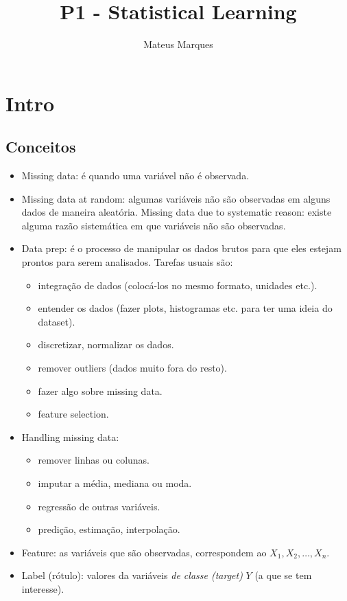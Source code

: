\documentclass[a4paper,fleqn,12pt]{article}
\title{\Huge{\textbf{P1 - Statistical Learning}}}
\author{Mateus Marques}
\begin{document}
\maketitle

\section{Intro}

\subsection{Conceitos}

\begin{itemize}
\item Missing data: é quando uma variável não é observada.
\item Missing data at random: algumas variáveis não são observadas em alguns dados de maneira aleatória. Missing data due to systematic reason: existe alguma razão sistemática em que variáveis não são observadas.
\item Data prep: é o processo de manipular os dados brutos para que eles estejam prontos para serem analisados. Tarefas usuais são:
\begin{itemize}
\item integração de dados (colocá-los no mesmo formato, unidades etc.).
\item entender os dados (fazer plots, histogramas etc. para ter uma ideia do dataset).
\item discretizar, normalizar os dados.
\item remover outliers (dados muito fora do resto).
\item fazer algo sobre missing data.
\item feature selection.
\end{itemize}
\item Handling missing data:
\begin{itemize}
\item remover linhas ou colunas.
\item imputar a média, mediana ou moda.
\item regressão de outras variáveis.
\item predição, estimação, interpolação.
\end{itemize}
\item Feature: as variáveis que são observadas, correspondem ao $X_1, X_2, \ldots, X_n$.
\item Label (rótulo): valores da variáveis \textit{de classe (target)} $Y$ (a que se tem interesse).

\end{itemize}
\end{document}
